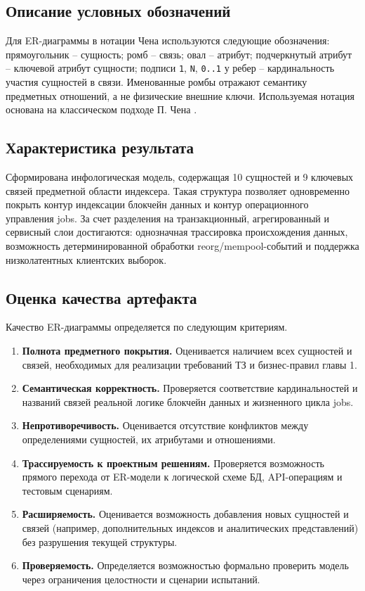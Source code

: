 ﻿\documentclass[14pt,a4paper]{extarticle}
\begin{document}
\subsection{Описание условных обозначений}
\noindent Для ER-диаграммы в нотации Чена используются следующие обозначения: прямоугольник -- сущность; ромб -- связь; овал -- атрибут; подчеркнутый атрибут -- ключевой атрибут сущности; подписи \texttt{1}, \texttt{N}, \texttt{0..1} у ребер -- кардинальность участия сущностей в связи. Именованные ромбы отражают семантику предметных отношений, а не физические внешние ключи. Используемая нотация основана на классическом подходе П. Чена \cite{src_chen}.

\subsection{Характеристика результата}
\noindent Сформирована инфологическая модель, содержащая 10 сущностей и 9 ключевых связей предметной области индексера. Такая структура позволяет одновременно покрыть контур индексации блокчейн данных и контур операционного управления jobs. За счет разделения на транзакционный, агрегированный и сервисный слои достигаются: однозначная трассировка происхождения данных, возможность детерминированной обработки reorg/mempool-событий и поддержка низколатентных клиентских выборок.

\subsection{Оценка качества артефакта}
\noindent Качество ER-диаграммы определяется по следующим критериям.
\begin{enumerate}
  \item \textbf{Полнота предметного покрытия.} Оценивается наличием всех сущностей и связей, необходимых для реализации требований ТЗ и бизнес-правил главы 1.
  \item \textbf{Семантическая корректность.} Проверяется соответствие кардинальностей и названий связей реальной логике блокчейн данных и жизненного цикла jobs.
  \item \textbf{Непротиворечивость.} Оценивается отсутствие конфликтов между определениями сущностей, их атрибутами и отношениями.
  \item \textbf{Трассируемость к проектным решениям.} Проверяется возможность прямого перехода от ER-модели к логической схеме БД, API-операциям и тестовым сценариям.
  \item \textbf{Расширяемость.} Оценивается возможность добавления новых сущностей и связей (например, дополнительных индексов и аналитических представлений) без разрушения текущей структуры.
  \item \textbf{Проверяемость.} Определяется возможностью формально проверить модель через ограничения целостности и сценарии испытаний.
\end{enumerate}
\end{document}
